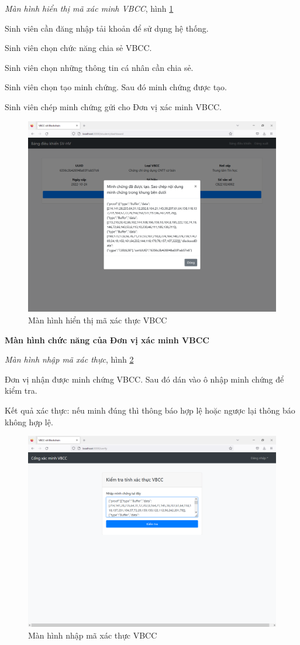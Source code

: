 \emph{Màn hình hiển thị mã xác minh VBCC}, hình \ref{fig:sv_minhchung}

Sinh viên cần đăng nhập tải khoản để sử dụng hệ thống.

Sinh viên chọn chức năng chia sẻ VBCC.

Sinh viên chọn những thông tin cá nhân cần chia sẻ.

Sinh viên chọn tạo minh chứng. Sau đó minh chứng được tạo.

Sinh viên chép minh chứng gửi cho Đơn vị xác minh VBCC.

\begin{figure}[H]
\centering
\includegraphics[width=.9\linewidth]{img/sv_minhchung.PNG}
\caption{Màn hình hiển thị mã xác thực VBCC}
\label{fig:sv_minhchung}
\end{figure}

\textbf{Màn hình chức năng của Đơn vị xác minh VBCC}

\emph{Màn hình nhập mã xác thực}, hình \ref{fig:v_begin}

Đơn vị nhận được minh chứng VBCC. 
Sau đó dán vào ô nhập minh chứng để kiểm tra.

Kết quả xác thực: nếu minh đúng thì thông báo hợp lệ hoặc ngược lại thông báo không hợp lệ.
\begin{figure}[H]
\centering
\includegraphics[width=.9\linewidth]{img/v_begin.PNG}
\caption{Màn hình nhập mã xác thực VBCC}
\label{fig:v_begin}
\end{figure}

